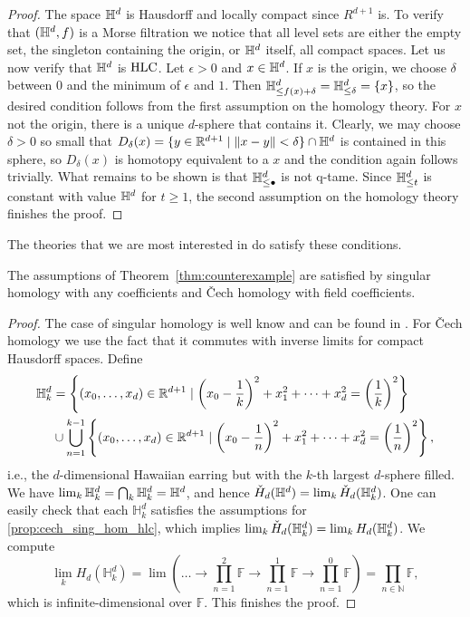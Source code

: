 \begin{proof}
	The space $\mathbb{H}^d$ is Hausdorff and locally compact since $R^{d+1}$ is.
	To verify that $(\mathbb{H}^d,f)$ is a Morse filtration we notice that all level sets are either the empty set, the singleton containing the origin, or $\mathbb{H}^d$ itself, all compact spaces.
	Let us now verify that $\mathbb{H}^d$ is $\mathrm{HLC}$.
	Let $\epsilon > 0$ and $x \in \mathbb{H}^d$.
	If $x$ is the origin, we choose $\delta$ between $0$ and the minimum of $\epsilon$ and $1$.
	Then $\mathbb{H}^d_{\leq f(x) + \delta} = \mathbb{H}^d_{\leq \delta} = \{x\}$, so the desired condition follows from the first assumption on the homology theory.
	For $x$ not the origin, there is a unique $d$-sphere that contains it.
	Clearly, we may choose $\delta > 0$ so small that $D_\delta(x) = \{y \in \mathbb{R}^{d+1} \mid \Vert x - y \Vert < \delta\} \cap \mathbb{H}^d$ is contained in this sphere, so $D_\delta(x)$ is homotopy equivalent to a $x$ and the condition again follows trivially.
	What remains to be shown is that $\mathbb{H}^d_{\leq \bullet}$ is not q-tame.
	Since $\mathbb{H}^d_{\leq t}$ is constant with value $\mathbb{H}^d$ for $t \geq 1$, the second assumption on the homology theory finishes the proof.
\end{proof}

The theories that we are most interested in do satisfy these conditions.

\begin{prop}
	The assumptions of Theorem~\ref{thm:counterexample} are satisfied by singular homology with any coefficients and \v{Cech} homology with field coefficients.
\end{prop}

\begin{proof}
	The case of singular homology is well know and can be found in \cite{Barratt.1962}.
	For \v{C}ech homology we use the fact that it commutes with inverse limits for compact Hausdorff spaces.
	Define 
	\begin{align*}
	\mathbb{H}^d_k &= \left\{(x_0,\dots,x_d)\in\mathbb{R}^{d+1}\mid \left(x_0-\frac{1}{k}\right)^2+x_1^2+\dots+x_d^2=\left(\frac{1}{k}\right)^2\right\}\\
	&\cup\bigcup_{n=1}^{k-1}\left\{(x_0,\dots,x_d)\in\mathbb{R}^{d+1}\mid \left(x_0-\frac{1}{n}\right)^2+x_1^2+\dots+x_d^2=\left(\frac{1}{n}\right)^2\right\},
	\end{align*}
	i.e., the $d$-dimensional Hawaiian earring but with the $k$-th largest $d$-sphere filled.
	We have $\lim_{k}\mathbb{H}^d_{k} = \bigcap_{k}\mathbb{H}^{d}_{k}=\mathbb{H}^{d}$, and hence $\check{H}_{d}(\mathbb{H}^d) = \lim_{k}\check{H}_{d}(\mathbb{H}^{d}_{k})$.
	One can easily check that each $\mathbb{H}^{d}_{k}$ satisfies the assumptions for \cref{prop:cech_sing_hom_hlc}, which implies $\lim_{k}\check{H}_{d}(\mathbb{H}^{d}_{k})=\lim_{k}H_{d}(\mathbb{H}^{d}_{k})$.
	We compute
	\begin{equation*}
	\lim_{k}H_{d}(\mathbb{H}^{d}_{k})=\lim\left(\dots\to \prod_{n=1}^2\mathbb{F}\to \prod_{n=1}^1\mathbb{F}\to \prod_{n=1}^0\mathbb{F}\right)=\prod_{n\in\mathbb{N}}\mathbb{F},
	\end{equation*}
	which is infinite-dimensional over $\mathbb{F}$.
	This finishes the proof.
\end{proof}

